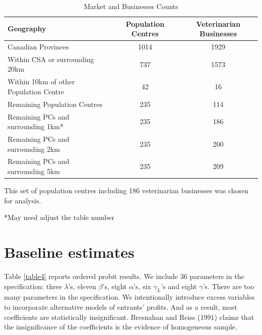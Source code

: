 \documentclass[a4paper,11pt]{article}
\begin{document}
\begin{table}[h]  
\begin{threeparttable}
\caption{Market and Businesses Counts} %
\centering %
\begin{tabular}{l c c } %
\hline\hline   
 Geography & Population Centres & Veterinarian Businesses   
\\ [0.5ex]  
\hline   
Canadian Provinces & 1014 & 1929 \\
Within CSA or surrounding 20km & 737 & 1573 \\
Within 10km of other Population Centre & 42 & 16 \\
Remaining Population Centres & 235 & 114 \\

Remaining PCs and surrounding 1km* & 235 & 186 \\

Remaining PCs and surrounding 2km  & 235 & 200 \\

Remaining PCs and surrounding 5km  & 235 & 209 \\

\hline %
\end{tabular}  
\begin{tablenotes}
    \small  *This set of population centres including 186 veterinarian businesses was chosen for analysis. 
\end{tablenotes}
\end{threeparttable}
\end{table}  
\alert{*May need adjust the table number}
\section{Baseline estimates}

Table \ref{table4} reports ordered probit results. We include 36 parameters in the specification: three $\lambda$'s, eleven $\beta$'s, eight $\alpha$'s, six $\gamma_L$'s and eight $\gamma$'s. There are too many parameters in the specification. We intentionally introduce excess variables to incorporate alternative models of entrants' profits. And as a result, most coefficients are statistically insignificant. Bresnahan and Reiss (1991) claims that the insignificance of the coefficients is the evidence of homogeneous sample. 
\end{document}

